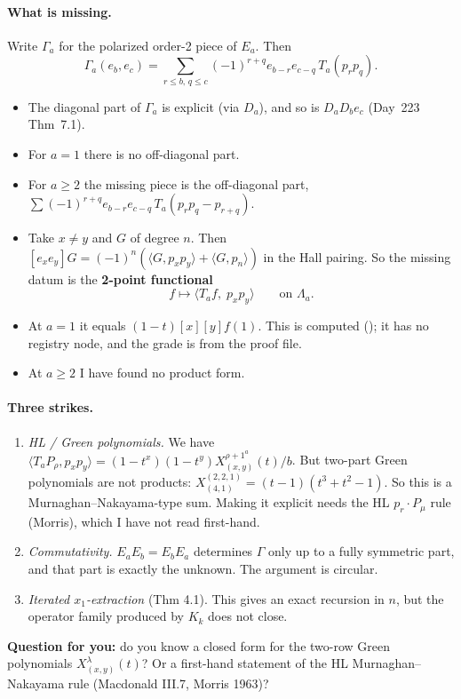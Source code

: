 \documentclass[10pt]{article}
\newcommand{\file}[1]{{\footnotesize\texttt{\detokenize{#1}}}}
\begin{document}
\paragraph{What is missing.} Write $\Gamma_a$ for the polarized order-2 piece of $E_a$. Then
\[\Gamma_a(e_b,e_c)=\sum_{r\le b,\,q\le c}(-1)^{r+q}e_{b-r}e_{c-q}\,T_a(p_rp_q).\]
\begin{itemize}
\item The diagonal part of $\Gamma_a$ is explicit (via $D_a$), and so is $D_aD_be_c$ (Day~223 Thm~7.1).
\item For $a=1$ there is no off-diagonal part.
\item For $a\ge2$ the missing piece is the off-diagonal part,
  $\sum(-1)^{r+q}e_{b-r}e_{c-q}\,T_a(p_rp_q-p_{r+q})$.
\item Take $x\ne y$ and $G$ of degree $n$. Then $[e_xe_y]G=(-1)^n(\langle G,p_xp_y\rangle+\langle G,p_n\rangle)$ in the
  Hall pairing. So the missing datum is the \textbf{2-point functional}
  \[f\longmapsto\langle T_af,\;p_xp_y\rangle\qquad\text{on }\Lambda_a.\]
\item At $a=1$ it equals $(1-t)[x][y]f(1)$. This is computed (\file{twopoint.log}); it has no registry node, and the
  grade is from the proof file.
\item At $a\ge2$ I have found no product form.
\end{itemize}

\paragraph{Three strikes.}
\begin{enumerate}
\item \emph{HL / Green polynomials.} We have
  $\langle T_aP_\rho,p_xp_y\rangle=(1-t^x)(1-t^y)X^{\rho+1^a}_{(x,y)}(t)/b$. But two-part Green polynomials are not
  products: $X^{(2,2,1)}_{(4,1)}=(t-1)(t^3+t^2-1)$. So this is a Murnaghan--Nakayama-type sum. Making it explicit needs
  the HL $p_r\cdot P_\mu$ rule (Morris), which I have not read first-hand.
\item \emph{Commutativity.} $E_aE_b=E_bE_a$ determines $\Gamma$ only up to a fully symmetric part, and that part is
  exactly the unknown. The argument is circular.
\item \emph{Iterated $x_1$-extraction} (Thm 4.1). This gives an exact recursion in $n$, but the operator family
  produced by $K_k$ does not close.
\end{enumerate}
\textbf{Question for you:} do you know a closed form for the two-row Green polynomials $X^\lambda_{(x,y)}(t)$? Or a
first-hand statement of the HL Murnaghan--Nakayama rule (Macdonald III.7, Morris 1963)?
\end{document}
